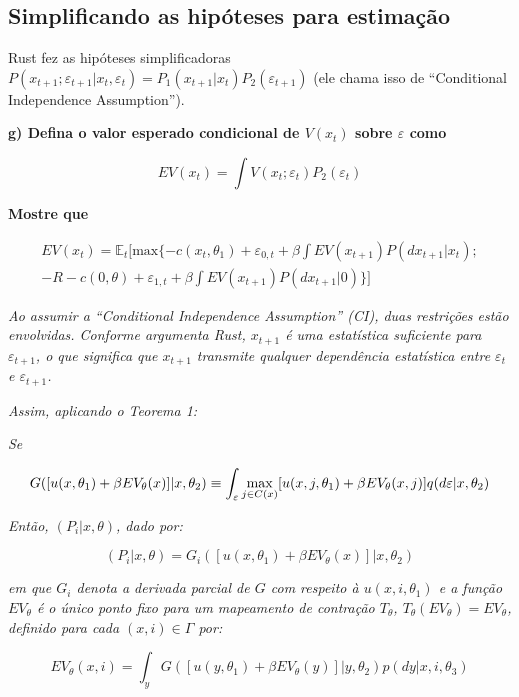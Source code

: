 \documentclass[12pt,a4paper]{article}
\begin{document}
\hypertarget{simplificando-as-hipoteses-para-estimacao}{%
\subsection{Simplificando as hipóteses para
estimação}\label{simplificando-as-hipoteses-para-estimacao}}

Rust fez as hipóteses simplificadoras
\(P (x_{t+1}; \varepsilon_{t+1}| x_t, \varepsilon_t) = P_1 ( x_{t+1}| x_t)P_2(\varepsilon_{t+1})\)
(ele chama isso de ``Conditional Independence Assumption'').

\textbf{g) Defina o valor esperado condicional de \(V(x_t)\) sobre
\(\varepsilon\) como}

\textbf{\[EV(x_t)= \int V(x_t;\varepsilon_t)P_2(\varepsilon_t)\]}

\textbf{Mostre que}

\[
\begin{aligned}
EV(x_t)=\mathbb{E}_t[\text{max}\{-c(x_t,\theta_1)+\varepsilon_{0,t} + \beta \int EV(x_{t+1})P(dx_{t+1}|x_t); \\ -R -c(0,\theta) + \varepsilon_{1,t} + \beta \int EV(x_{t+1})P(dx_{t+1}|0)\}]
\end{aligned}
\]

\emph{Ao assumir a ``Conditional Independence Assumption'' (CI), duas
restrições estão envolvidas. Conforme argumenta Rust, \(x_{t+1}\) é uma
estatística suficiente para \(\varepsilon_{t+1}\), o que significa que
\(x_{t+1}\) transmite qualquer dependência estatística entre
\(\varepsilon_{t}\) e \(\varepsilon_{t+1}\).}

\emph{Assim, aplicando o Teorema 1:}

\emph{Se}

\[G([u(x,\theta_1)+\beta EV_\theta(x)]|x,\theta_2) \\ \equiv \int_\varepsilon \max_{j \in C(x)} [u(x,j,\theta_1)+ \beta E V_\theta(x,j)]q(d\varepsilon|x,\theta_2)
\]

\emph{Então, \((P_i|x,\theta)\), dado por:}

\[
(P_i|x,\theta) = G_i([u(x,\theta_1)+ \beta EV_\theta(x)]|x,\theta_2)
\]

\emph{em que \(G_i\) denota a derivada parcial de \(G\) com respeito à
\(u(x,i,\theta_1)\) e a função \(EV_\theta\) é o único ponto fixo para
um mapeamento de contração \(T_\theta\),
\(T_\theta(EV_\theta)=EV_\theta\), definido para cada
\((x,i) \in \Gamma\) por:}

\[
EV_\theta(x,i)=\int_yG([u(y,\theta_1)+\beta EV_\theta (y)]|y,\theta_2)p(dy|x,i,\theta_3)
\]
\end{document}
